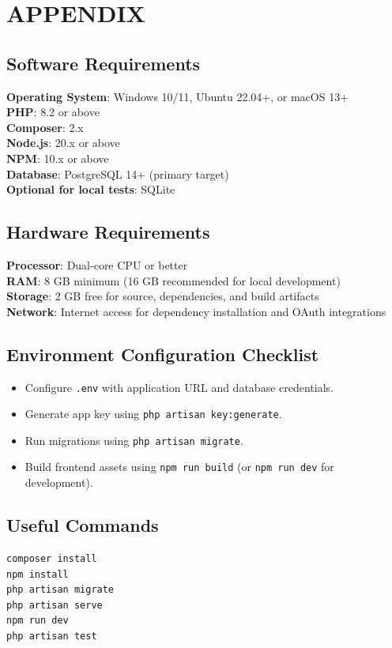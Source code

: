 \chapter{APPENDIX}

\section{Software Requirements}
\textbf{Operating System}: Windows 10/11, Ubuntu 22.04+, or macOS 13+\\
\textbf{PHP}: 8.2 or above\\
\textbf{Composer}: 2.x\\
\textbf{Node.js}: 20.x or above\\
\textbf{NPM}: 10.x or above\\
\textbf{Database}: PostgreSQL 14+ (primary target)\\
\textbf{Optional for local tests}: SQLite

\section{Hardware Requirements}
\textbf{Processor}: Dual-core CPU or better\\
\textbf{RAM}: 8 GB minimum (16 GB recommended for local development)\\
\textbf{Storage}: 2 GB free for source, dependencies, and build artifacts\\
\textbf{Network}: Internet access for dependency installation and OAuth integrations

\section{Environment Configuration Checklist}
\begin{itemize}
    \item Configure \texttt{.env} with application URL and database credentials.
    \item Generate app key using \texttt{php artisan key:generate}.
    \item Run migrations using \texttt{php artisan migrate}.
    \item Build frontend assets using \texttt{npm run build} (or \texttt{npm run dev} for development).
\end{itemize}

\section{Useful Commands}
\begin{verbatim}
composer install
npm install
php artisan migrate
php artisan serve
npm run dev
php artisan test
\end{verbatim}

